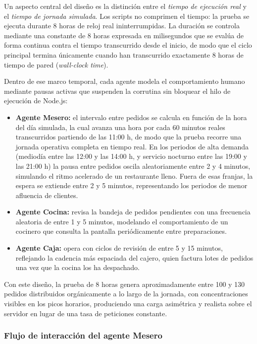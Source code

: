 Un aspecto central del diseño es la distinción entre el \textit{tiempo de ejecución real} y el \textit{tiempo de jornada simulada}. Los scripts no comprimen el tiempo: la prueba se ejecuta durante 8 horas de reloj real ininterrumpidas. La duración se controla mediante una constante de 8 horas expresada en milisegundos que se evalúa de forma continua contra el tiempo transcurrido desde el inicio, de modo que el ciclo principal termina únicamente cuando han transcurrido exactamente 8 horas de tiempo de pared (\textit{wall-clock time}).

Dentro de ese marco temporal, cada agente modela el comportamiento humano mediante pausas activas que suspenden la corrutina sin bloquear el hilo de ejecución de Node.js:

\begin{itemize}
	\item \textbf{Agente Mesero:} el intervalo entre pedidos se calcula en función de la hora del día simulada, la cual avanza una hora por cada 60 minutos reales transcurridos partiendo de las 11:00 h, de modo que la prueba recorre una jornada operativa completa en tiempo real. En los periodos de alta demanda (mediodía entre las 12:00 y las 14:00 h, y servicio nocturno entre las 19:00 y las 21:00 h) la pausa entre pedidos oscila aleatoriamente entre 2 y 4 minutos, simulando el ritmo acelerado de un restaurante lleno. Fuera de esas franjas, la espera se extiende entre 2 y 5 minutos, representando los periodos de menor afluencia de clientes.
	\item \textbf{Agente Cocina:} revisa la bandeja de pedidos pendientes con una frecuencia aleatoria de entre 1 y 5 minutos, modelando el comportamiento de un cocinero que consulta la pantalla periódicamente entre preparaciones.
	\item \textbf{Agente Caja:} opera con ciclos de revisión de entre 5 y 15 minutos, reflejando la cadencia más espaciada del cajero, quien factura lotes de pedidos una vez que la cocina los ha despachado.
\end{itemize}

Con este diseño, la prueba de 8 horas genera aproximadamente entre 100 y 130 pedidos distribuidos orgánicamente a lo largo de la jornada, con concentraciones visibles en los picos horarios, produciendo una carga asimétrica y realista sobre el servidor en lugar de una tasa de peticiones constante.

\subsubsection*{Flujo de interacción del agente Mesero}

